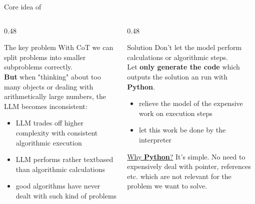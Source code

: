 \begin{frame}{Core idea of \PAL{}}
\begin{columns}[T,totalwidth=\textwidth]
\begin{column}{0.48\textwidth}
\begin{block}{The key problem}
  With CoT we can split problems into smaller subproblems correctly.\\
  \textbf{But} when "thinking" about too many objects or dealing with arithmetically large numbers,
  the LLM becomes inconsistent:\begin{itemize}
    \item LLM trades off higher complexity with consistent algorithmic execution 
    \item LLM performs rather textbased than algorithmic calculations
    \item good algorithms have never dealt with such kind of problems
  \end{itemize} 
\end{block}
\end{column}
\begin{column}{0.48\textwidth}

\begin{exampleblock}{Solution}
  Don't let the model perform calculations or algorithmic steps.\\
  Let \textbf{only generate the code} which outputs the solution an run with \textbf{Python}.
  \begin{itemize}
    \item[\textrightarrow] relieve the model of the expensive work on execution steps
    \item[\textrightarrow] let this work be done by the interpreter
  \end{itemize}
  \underline{Why \textbf{Python}?} It's simple. 
  No need to expensively deal with pointer, references etc. which are not relevant for the problem we want to solve.
\end{exampleblock}

\end{column}
\end{columns}
\end{frame}
